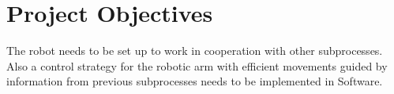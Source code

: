 
\chapter{Project Objectives}
%
The robot needs to be set up to work in cooperation with other subprocesses. Also a control strategy for the robotic arm with efficient movements guided by information from previous subprocesses needs to be implemented in Software.



